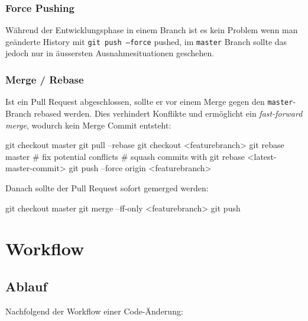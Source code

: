 \subsubsection{Force Pushing}

Während der Entwicklungsphase in einem Branch ist es kein Problem wenn man
geänderte History mit \texttt{git push --force} pushed, im \texttt{master}
Branch sollte das jedoch nur in äussersten Ausnahmesituationen geschehen.

\subsubsection{Merge / Rebase}

Ist ein Pull Request abgeschlossen, sollte er vor einem Merge gegen den
\texttt{master}-Branch rebased werden. Dies verhindert Konflikte und ermöglicht
ein \textit{fast-forward merge}, wodurch kein Merge Commit entsteht:

\begin{bashcode}
git checkout master
git pull --rebase
git checkout <featurebranch>
git rebase master
# fix potential conflicts
# squash commits with git rebase <latest-master-commit>
git push --force origin <featurebranch>
\end{bashcode}

\noindent Danach sollte der Pull Request sofort gemerged werden:

\begin{bashcode}
git checkout master
git merge --ff-only <featurebranch>
git push
\end{bashcode}


\section{Workflow}

\subsection{Ablauf}

Nachfolgend der Workflow einer Code-Änderung:

